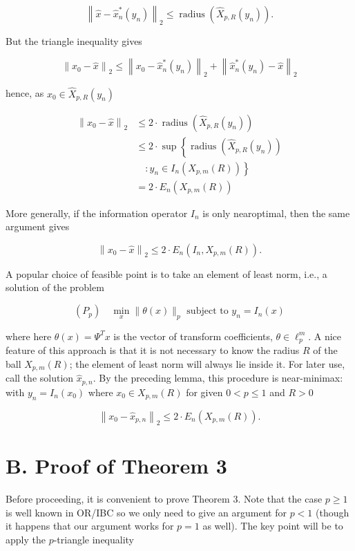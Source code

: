 \documentclass[10pt]{article}
\begin{document}
$$
\left\|\hat{x}-\hat{x}_{n}^{*}\left(y_{n}\right)\right\|_{2} \leq \operatorname{radius}\left(\hat{X}_{p, R}\left(y_{n}\right)\right) .
$$

But the triangle inequality gives

$$
\left\|x_{0}-\hat{x}\right\|_{2} \leq\left\|x_{0}-\hat{x}_{n}^{*}\left(y_{n}\right)\right\|_{2}+\left\|\hat{x}_{n}^{*}\left(y_{n}\right)-\hat{x}\right\|_{2}
$$

hence, as $x_{0} \in \hat{X}_{p, R}\left(y_{n}\right)$

$$
\begin{aligned}
\left\|x_{0}-\hat{x}\right\|_{2} & \leq 2 \cdot \operatorname{radius}\left(\hat{X}_{p, R}\left(y_{n}\right)\right) \\
& \leq 2 \cdot \sup \left\{\operatorname{radius}\left(\hat{X}_{p, R}\left(y_{n}\right)\right)\right. \\
& \left.\quad: y_{n} \in I_{n}\left(X_{p, m}(R)\right)\right\} \\
& =2 \cdot E_{n}\left(X_{p, m}(R)\right)
\end{aligned}
$$

More generally, if the information operator $I_{n}$ is only nearoptimal, then the same argument gives


\begin{equation*}
\left\|x_{0}-\hat{x}\right\|_{2} \leq 2 \cdot E_{n}\left(I_{n}, X_{p, m}(R)\right) . \tag{III.2}
\end{equation*}


A popular choice of feasible point is to take an element of least norm, i.e., a solution of the problem

$$
\left(P_{p}\right) \quad \min _{x}\|\theta(x)\|_{p} \text { subject to } y_{n}=I_{n}(x)
$$

where here $\theta(x)=\Psi^{T} x$ is the vector of transform coefficients, $\theta \in \ell_{p}^{m}$. A nice feature of this approach is that it is not necessary to know the radius $R$ of the ball $X_{p, m}(R)$; the element of least norm will always lie inside it. For later use, call the solution $\hat{x}_{p, n}$. By the preceding lemma, this procedure is near-minimax:\\
with $y_{n}=I_{n}\left(x_{0}\right)$ where $x_{0} \in X_{p, m}(R)$ for given $0<p \leq 1$ and $R>0$

$$
\left\|x_{0}-\hat{x}_{p, n}\right\|_{2} \leq 2 \cdot E_{n}\left(X_{p, m}(R)\right) .
$$

\section*{B. Proof of Theorem 3}
Before proceeding, it is convenient to prove Theorem 3. Note that the case $p \geq 1$ is well known in OR/IBC so we only need to give an argument for $p<1$ (though it happens that our argument works for $p=1$ as well). The key point will be to apply the $p$-triangle inequality
\end{document}
